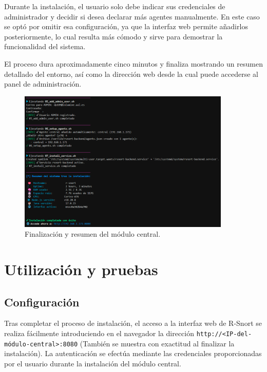 \documentclass[11pt,a4paper,twoside]{report}
\begin{document}
\newpage

Durante la instalación, el usuario solo debe indicar sus credenciales de administrador y decidir si desea declarar más agentes manualmente. En este caso se optó por omitir esa configuración, ya que la interfaz web permite añadirlos posteriormente, lo cual resulta más cómodo y sirve para demostrar la funcionalidad del sistema.\newline

El proceso dura aproximadamente cinco minutos y finaliza mostrando un resumen detallado del entorno, así como la dirección web desde la cual puede accederse al panel de administración.

\begin{figure}[H]
	\centering
	\includegraphics[width=0.9\textwidth]{install/7.png}
	\caption{Finalización y resumen del módulo central.}
	\label{fig:fin-central-module}
\end{figure}

\newpage


\section{Utilización y pruebas}

\subsection{Configuración}

Tras completar el proceso de instalación, el acceso a la interfaz web de R-Snort se realiza fácilmente introduciendo en el navegador la dirección \texttt{http://<IP-del-módulo-central>:8080} (También se muestra con exactitud al finalizar la instalación). La autenticación se efectúa mediante las credenciales proporcionadas por el usuario durante la instalación del módulo central.
\end{document}

